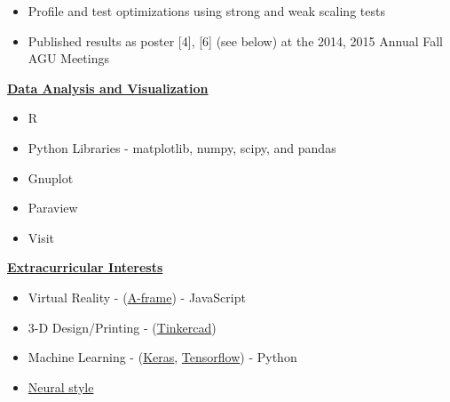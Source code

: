 \documentclass[11pt]{ltxdoc}
\begin{document}
\begin{description}
\begin{description}
\begin{itemize}
\begin{itemize}
          	\item Profile and test optimizations using strong and weak scaling tests
          	
          	\item Published results as poster [4], [6] (see below) at the 2014, 2015 Annual Fall AGU Meetings
          	
          \end{itemize}
           

      \end{itemize}

    
    \end{description}
    
    \item[] \textbf{\underline{Data Analysis and Visualization}}
    
      \begin{itemize}
      	    	
        \item R
       
        \item Python Libraries - matplotlib, numpy, scipy, and pandas
        
        \item Gnuplot
        
        \item Paraview 
        
        \item Visit
        
        
      \end{itemize}
  
    
    \item[] \textbf{\underline{Extracurricular Interests}}
    
      \begin{itemize}
        \item Virtual Reality - (\href{https://aframe.io/}{A-frame}) - JavaScript
        \item  3-D Design/Printing - (\href{https://www.tinkercad.com/#/}{Tinkercad})
      
        \item  Machine Learning - (\href{https://keras.io}{Keras}, \href{https://www.tensorflow.org/guide/premade_estimators}{Tensorflow}) - Python
        
        \item \href{https://github.com/jcjohnson/neural-style}{Neural style}
      
      \end{itemize}

  \end{description}
\end{document}
